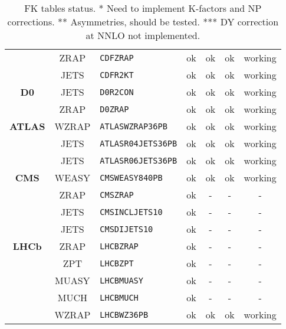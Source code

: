 \begin{table}[H]
\begin{centering}
\begin{tabular}{|c|c|l|c|c|c|c|}
\cline{3-7} 
 & {\scriptsize ZRAP} & \texttt{\scriptsize CDFZRAP} & {\scriptsize ok} & {\scriptsize ok} & {\scriptsize ok} & {\scriptsize working}\tabularnewline
\cline{3-7} 
 & {\scriptsize JETS} & \texttt{\scriptsize CDFR2KT} & {\scriptsize ok} & {\scriptsize ok} & {\scriptsize ok} & {\scriptsize working}\tabularnewline
\hline 
\textbf{\scriptsize D0 } & {\scriptsize JETS} & \texttt{\scriptsize D0R2CON} & {\scriptsize ok} & {\scriptsize ok} & {\scriptsize ok} & {\scriptsize working}\tabularnewline
\cline{3-7} 
 & {\scriptsize ZRAP} & \texttt{\scriptsize D0ZRAP} & {\scriptsize ok} & {\scriptsize ok} & {\scriptsize ok} & {\scriptsize working}\tabularnewline
\hline 
\textbf{\scriptsize ATLAS } & {\scriptsize WZRAP} & \texttt{\scriptsize ATLASWZRAP36PB} & {\scriptsize ok} & {\scriptsize ok} & {\scriptsize ok} & {\scriptsize working}\tabularnewline
\cline{3-7} 
 & {\scriptsize JETS} & \texttt{\scriptsize ATLASR04JETS36PB} & {\scriptsize ok} & {\scriptsize ok} & {\scriptsize ok} & {\scriptsize working}\tabularnewline
\cline{3-7} 
 & {\scriptsize JETS} & \texttt{\scriptsize ATLASR06JETS36PB} & {\scriptsize ok} & {\scriptsize ok} & {\scriptsize ok} & {\scriptsize working}\tabularnewline
\hline 
\textbf{\scriptsize CMS } & {\scriptsize WEASY} & \texttt{\scriptsize CMSWEASY840PB} & {\scriptsize ok} & {\scriptsize ok} & {\scriptsize ok} & {\scriptsize working}\tabularnewline
\cline{2-7} 
 & {\scriptsize ZRAP} & \texttt{\scriptsize CMSZRAP} & {\scriptsize ok} & {\scriptsize -} & {\scriptsize -} & {\scriptsize -}\tabularnewline
\cline{2-7} 
 & {\scriptsize JETS} & \texttt{\scriptsize CMSINCLJETS10} & {\scriptsize ok} & {\scriptsize -} & {\scriptsize -} & {\scriptsize -}\tabularnewline
\cline{2-7} 
 & {\scriptsize JETS} & \texttt{\scriptsize CMSDIJETS10} & {\scriptsize ok} & {\scriptsize -} & {\scriptsize -} & {\scriptsize -}\tabularnewline
\hline 
\textbf{\scriptsize LHCb} & {\scriptsize ZRAP} & \texttt{\scriptsize LHCBZRAP} & {\scriptsize ok} & {\scriptsize -} & {\scriptsize -} & {\scriptsize -}\tabularnewline
\cline{2-7} 
 & {\scriptsize ZPT} & \texttt{\scriptsize LHCBZPT} & {\scriptsize ok} & {\scriptsize -} & {\scriptsize -} & {\scriptsize -}\tabularnewline
\cline{2-7} 
 & {\scriptsize MUASY} & \texttt{\scriptsize LHCBMUASY} & {\scriptsize ok} & {\scriptsize -} & {\scriptsize -} & {\scriptsize -}\tabularnewline
\cline{2-7} 
 & {\scriptsize MUCH} & \texttt{\scriptsize LHCBMUCH} & {\scriptsize ok} & {\scriptsize -} & {\scriptsize -} & {\scriptsize -}\tabularnewline
\cline{2-7} 
 & {\scriptsize WZRAP} & \texttt{\scriptsize LHCBWZ36PB} & {\scriptsize ok} & {\scriptsize ok} & {\scriptsize ok} & {\scriptsize working}\tabularnewline
\hline 
\end{tabular}
\par\end{centering}{\scriptsize \par}

\caption{\label{tab:FK-tables-status.}FK tables status. {*} Need to implement
K-factors and NP corrections. {*}{*} Asymmetries, should be tested.
{*}{*}{*} DY correction at NNLO not implemented.}
\end{table}



